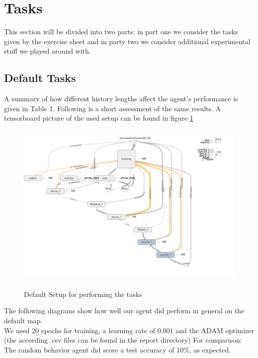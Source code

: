 \documentclass[a4paper]{article}
\begin{document}
\clearpage
\section{Tasks}
This section will be divided into two parts: in part one we consider the tasks given by the exercise sheet and in party two we consider additional experimental stuff we played around with.

\subsection{\textbf{Default Tasks}}

A summary of how different history lengths affect the agent's performance is given in Table 1. Following is a short assessment of the same results. A tensorboard picture of the used setup can be found in figure \ref{fig:tb_default}
\begin{figure}[hbpt!]
\centering
\includegraphics[height=8cm, width=\textwidth]{default_setup_graph.png}
\label{fig:tb_default}
\caption{Default Setup for performing the tasks}
\end{figure}

The following diagrams show how well our agent did perform in general on the default map.\\
We used 20 epochs for training, a learning rate of $0.001$ and the ADAM optimizer (the according .csv files can be found in the report directory)
For comparison: The random behavior agent did score a test accuracy of 10\%, as expected.
\end{document}
